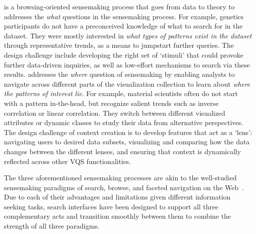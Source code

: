  is
a browsing-oriented sensemaking process
that goes from data to theory to
addresses the \textit{what} questions
in the sensemaking process.
 For example, genetics participants do not
 have a preconceived knowledge of what to search
 for in the dataset.
 They were mostly interested in
 \textit{what types of patterns exist in the dataset}
 through representative trends, as a means to
 jumpstart further queries. %
The design challenge include developing
the right set of `stimuli' that could
provoke further data-driven inquiries,
as well as low-effort mechanisms to search via these results.
 addresses the \textit{where}
question of sensemaking by enabling analysts
to navigate across different parts of the visualization
collection to learn about \textit{where  the patterns of interest lie}.
For example, material scientists often do not start
with a pattern in-the-head, but recognize salient
trends such as inverse correlation or linear correlation.
They switch between different visualized attributes or dynamic
classes to study their data from alternative perspectives.
The design challenge of context creation is to develop
features that act as a `lens': navigating users to desired data subsets,
visualizing and comparing how the data changes between the different lenses, and ensuring that context is dynamically reflected across other VQS functionalities.
\par\noindent The three aforementioned sensemaking processes are akin to the well-studied sensemaking paradigms of search, browse, and faceted navigation on the Web~\cite{Hearst2009,Olston2003}. Due to each of their advantages and limitations given different information seeking tasks, search interfaces have been designed to support all three complementary acts and transition smoothly between them to combine the strength of all three paradigms. 
